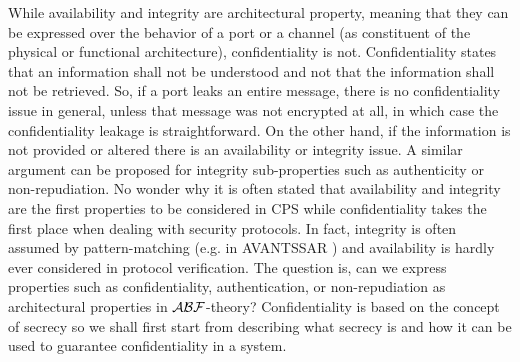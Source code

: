 While availability and integrity are architectural property, meaning that they
can be expressed over the behavior of a port or a channel (as constituent of
the physical or functional architecture), confidentiality is not.
Confidentiality states that an information shall not be understood and not that
the information shall not be retrieved. So, if a port leaks an entire message,
there is no confidentiality issue in general, unless that message was not
encrypted at all, in which case the confidentiality leakage is straightforward. 
On the other hand, if the
information is not provided or altered there is an availability or integrity
issue. A similar argument can be proposed for integrity sub-properties such as
authenticity or non-repudiation. No wonder why it is often stated that
availability and integrity are the first properties to be considered in CPS
while confidentiality takes the first place when dealing with security
protocols. In fact, integrity is often assumed by pattern-matching (e.g. in
AVANTSSAR \autocite{Armando2012avantssar}) and availability is hardly ever considered in
protocol verification. The question is, can we express properties such as
confidentiality, authentication, or non-repudiation as architectural properties
in $\mathcal{A}\mathcal{B}\mathcal{F}$-theory? Confidentiality is based on the concept 
of secrecy so we shall first start from describing what secrecy is and how it
can be used to guarantee confidentiality in a system.

